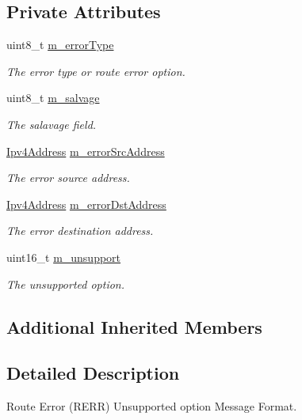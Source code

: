 \subsection*{Private Attributes}
\begin{DoxyCompactItemize}
\item 
uint8\+\_\+t \hyperlink{classns3_1_1dsr_1_1DsrOptionRerrUnsupportHeader_a88b3ef2427afde95075953f0a4069b3e}{m\+\_\+error\+Type}
\begin{DoxyCompactList}\small\item\em The error type or route error option. \end{DoxyCompactList}\item 
uint8\+\_\+t \hyperlink{classns3_1_1dsr_1_1DsrOptionRerrUnsupportHeader_ae6bc35aab7b428155034234d4f25552b}{m\+\_\+salvage}
\begin{DoxyCompactList}\small\item\em The salavage field. \end{DoxyCompactList}\item 
\hyperlink{classns3_1_1Ipv4Address}{Ipv4\+Address} \hyperlink{classns3_1_1dsr_1_1DsrOptionRerrUnsupportHeader_afcf8b2cdc4365f2e44e7f699ef8f4e90}{m\+\_\+error\+Src\+Address}
\begin{DoxyCompactList}\small\item\em The error source address. \end{DoxyCompactList}\item 
\hyperlink{classns3_1_1Ipv4Address}{Ipv4\+Address} \hyperlink{classns3_1_1dsr_1_1DsrOptionRerrUnsupportHeader_a8484a81d9affd2edc99c6ff369b5be24}{m\+\_\+error\+Dst\+Address}
\begin{DoxyCompactList}\small\item\em The error destination address. \end{DoxyCompactList}\item 
uint16\+\_\+t \hyperlink{classns3_1_1dsr_1_1DsrOptionRerrUnsupportHeader_a5e4a3590ca429b9adff9b93607e90d2e}{m\+\_\+unsupport}
\begin{DoxyCompactList}\small\item\em The unsupported option. \end{DoxyCompactList}\end{DoxyCompactItemize}
\subsection*{Additional Inherited Members}


\subsection{Detailed Description}
Route Error (R\+E\+RR) Unsupported option Message Format. 


